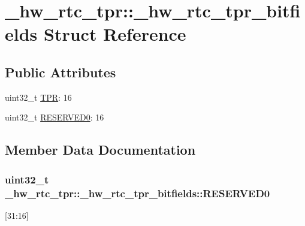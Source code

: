 \hypertarget{struct__hw__rtc__tpr_1_1__hw__rtc__tpr__bitfields}{}\section{\+\_\+hw\+\_\+rtc\+\_\+tpr\+:\+:\+\_\+hw\+\_\+rtc\+\_\+tpr\+\_\+bitfields Struct Reference}
\label{struct__hw__rtc__tpr_1_1__hw__rtc__tpr__bitfields}
\subsection*{Public Attributes}
\begin{DoxyCompactItemize}
\item 
uint32\+\_\+t \hyperlink{struct__hw__rtc__tpr_1_1__hw__rtc__tpr__bitfields_a3f6036203db66ad793c3898533cc5a59}{T\+PR}\+: 16
\item 
uint32\+\_\+t \hyperlink{struct__hw__rtc__tpr_1_1__hw__rtc__tpr__bitfields_ac0632d78235cc93d63467136613d1649}{R\+E\+S\+E\+R\+V\+E\+D0}\+: 16
\end{DoxyCompactItemize}


\subsection{Member Data Documentation}
\subsubsection[{\texorpdfstring{R\+E\+S\+E\+R\+V\+E\+D0}{RESERVED0}}]{\setlength{\rightskip}{0pt plus 5cm}uint32\+\_\+t \+\_\+hw\+\_\+rtc\+\_\+tpr\+::\+\_\+hw\+\_\+rtc\+\_\+tpr\+\_\+bitfields\+::\+R\+E\+S\+E\+R\+V\+E\+D0}\hypertarget{struct__hw__rtc__tpr_1_1__hw__rtc__tpr__bitfields_ac0632d78235cc93d63467136613d1649}{}\label{struct__hw__rtc__tpr_1_1__hw__rtc__tpr__bitfields_ac0632d78235cc93d63467136613d1649}
\mbox{[}31\+:16\mbox{]} 
